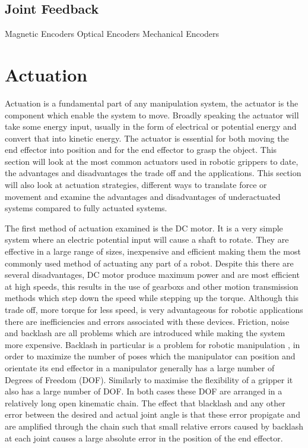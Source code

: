 \subsection{Joint Feedback}
Magnetic Encoders
Optical Encoders
Mechanical Encoders

\section{Actuation}
Actuation is a fundamental part of any manipulation system, the actuator is the component which enable the system to move. Broadly speaking the actuator will take some energy input, usually in the form of electrical or potential energy and convert that into kinetic energy. The actuator is essential for both moving the end effector into position and for the end effector to grasp the object. This section will look at the most common actuators used in robotic grippers to date, the advantages and disadvantages the trade off and the applications. This section will also look at actuation strategies, different ways to translate force or movement and examine the advantages and disadvantages of underactuated systems compared to fully actuated systems.

The first method of actuation examined is the DC motor. It is a very simple system where an electric potential input will cause a shaft to rotate. They are effective in a large range of sizes, inexpensive and efficient making them the most commonly used method of actuating any part of a robot. Despite this there are several disadvantages, DC motor produce maximum power and are most efficient at high speeds, this results in the use of gearboxs and other motion transmission methods which step down the speed while stepping up the torque. Although this trade off, more torque for less speed, is very advantageous for robotic applications there are inefficiencies and errors associated with these devices. Friction, noise and backlash are all problems which are introduced while making the system more expensive. Backlash in particular is a problem for robotic manipulation %
, in order to maximize the number of poses which the manipulator can position and orientate its end effector in a manipulator generally has a large number of Degrees of Freedom (DOF). Similarly to maximise the flexibility of a gripper it also has a large number of DOF. In both cases these DOF are arranged in a relatively long open kinematic chain. The effect that blacklash and any other error between the desired and actual joint angle is that these error propigate and are amplified through the chain such that small relative errors caused by backlash at each joint causes a large absolute error in the position of the end effector.

